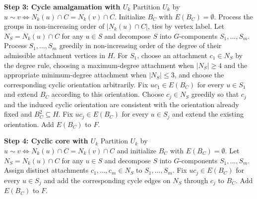 \documentclass[11pt]{article}
\begin{document}
\begin{algorithm} \ContinuedFloat \caption{Cyclic-Core Root Reconstruction (continued)} \label{algo::cyclic_core_reconstruction_2}
  \begin{algorithmic}[1]


  \Statex \textbf{Step 3: Cycle amalgamation with $U_k$}
      \State Partition $U_k$ by $u\sim v\iff N_k(u)\cap C=N_k(v)\cap C$.
      \State Initialize $B_C$ with $E(B_C)=\emptyset$.
      \State Process the groups in non-increasing order of $|N_k(u)\cap C|$, ties by vertex label.
          \State Let $N_S=N_k(u)\cap C$ for any $u\in S$ and decompose $S$ into $G$-components $S_1,\ldots,S_m$.
          \State Process $S_1,\ldots,S_m$ greedily in non-increasing order of the degree of their admissible attachment vertices in $H$.
          \State For $S_1$, choose an attachment $c_1\in N_S$ by the degree rule, choosing a maximum-degree attachment when $|N_S|\geq4$ and the appropriate minimum-degree attachment when $|N_S|\leq3$, and choose the corresponding cyclic orientation arbitrarily.
          \State Fix $uc_1\in E(B_C)$ for every $u\in S_1$ and extend $B_C$ according to this orientation.
              \State Choose $c_j\in N_S$ greedily so that $c_j$ and the induced cyclic orientation are consistent with the orientation already fixed and $B_C^2\subseteq H$.
              \State Fix $uc_j\in E(B_C)$ for every $u\in S_j$ and extend the existing orientation.
          \EndFor
      \EndFor
      \State Add $E(B_C)$ to $F$.
  \EndIf

  \Statex \textbf{Step 4: Cyclic core with $U_k$}
      \State Partition $U_k$ by $u\sim v\iff N_k(u)\cap C=N_k(v)\cap C$ and initialize $B_C$ with $E(B_C)=\emptyset$.
          \State Let $N_S=N_k(u)\cap C$ for any $u\in S$ and decompose $S$ into $G$-components $S_1,\ldots,S_m$.
              \State Assign distinct attachments $c_1,\ldots,c_m\in N_S$ to $S_1,\ldots,S_m$.
                  \State Fix $uc_j\in E(B_C)$ for every $u\in S_j$ and add the corresponding cycle edges on $N_S$ through $c_j$ to $B_C$.
              \EndFor
          \EndIf
      \EndFor
      \State Add $E(B_C)$ to $F$.
  \EndIf

  \end{algorithmic}
\end{algorithm}
\end{document}
